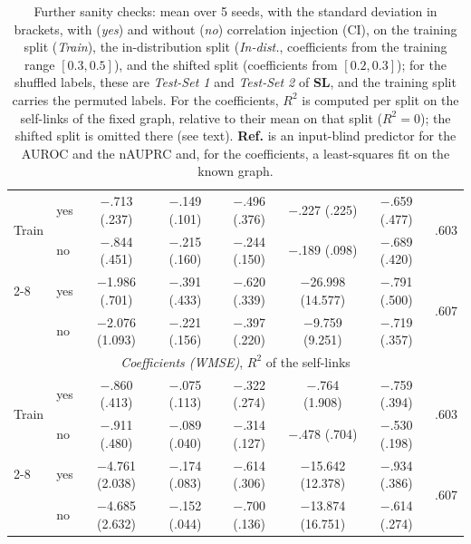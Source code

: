 \begin{table}[ht]
\begin{tabular}{llccccc|c}
    \midrule
        \multirow{2}{*}{Train} & yes & $-$.713 (.237) & $-$.149 (.101) & $-$.496 (.376) & $-$.227 (.225) & $-$.659 (.477) & \multirow{2}{*}{.603} \\
        ~ & no & $-$.844 (.451) & $-$.215 (.160) & $-$.244 (.150) & $-$.189 (.098) & $-$.689 (.420) & ~ \\
    \cmidrule{2-8}
        \multirow{2}{*}{In-dist.} & yes & $-$1.986 (.701) & $-$.391 (.433) & $-$.620 (.339) & $-$26.998 (14.577) & $-$.791 (.500) & \multirow{2}{*}{.607} \\
        ~ & no & $-$2.076 (1.093) & $-$.221 (.156) & $-$.397 (.220) & $-$9.759 (9.251) & $-$.719 (.357) & ~ \\
    \midrule
        \multicolumn{8}{c}{\textit{Coefficients (WMSE)}, $R^2$ of the self-links} \\
    \midrule
        \multirow{2}{*}{Train} & yes & $-$.860 (.413) & $-$.075 (.113) & $-$.322 (.274) & $-$.764 (1.908) & $-$.759 (.394) & \multirow{2}{*}{.603} \\
        ~ & no & $-$.911 (.480) & $-$.089 (.040) & $-$.314 (.127) & $-$.478 (.704) & $-$.530 (.198) & ~ \\
    \cmidrule{2-8}
        \multirow{2}{*}{In-dist.} & yes & $-$4.761 (2.038) & $-$.174 (.083) & $-$.614 (.306) & $-$15.642 (12.378) & $-$.934 (.386) & \multirow{2}{*}{.607} \\
        ~ & no & $-$4.685 (2.632) & $-$.152 (.044) & $-$.700 (.136) & $-$13.874 (16.751) & $-$.614 (.274) & ~ \\
    \bottomrule
    \end{tabular}
    \caption{Further sanity checks: mean over 5 seeds, with the standard deviation in brackets, with (\emph{yes}) and without (\emph{no}) correlation injection (CI), on the training split (\emph{Train}), the in-distribution split (\emph{In-dist.}, coefficients from the training range $[0.3,0.5]$), and the shifted split (coefficients from $[0.2,0.3]$); for the shuffled labels, these are \textit{Test-Set 1} and \textit{Test-Set 2} of \textbf{SL}, and the training split carries the permuted labels. For the coefficients, $R^2$ is computed per split on the self-links of the fixed graph, relative to their mean on that split ($R^2=0$); the shifted split is omitted there (see text). \textbf{Ref.} is an input-blind predictor for the AUROC and the nAUPRC and, for the coefficients, a least-squares fit on the known graph.}
    \label{tab:cp:sanity}
\end{table}
